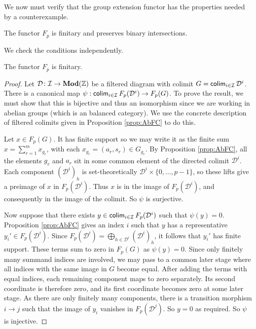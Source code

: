 \documentclass[runningheads]{llncs}
\begin{document}
We now must verify that the group extension functor has the properties needed by a counterexample.
\begin{propositionE}
The functor $F_p$ is finitary and preserves binary intersections.
\end{propositionE}
\begin{proofE}
We check the conditions independently.
\begin{lemma}
The functor $F_p$ is finitary.
\end{lemma}
\begin{proof}
Let $\mathcal D \colon \mathcal{I} \to \operatorname{\mathbf{Mod}}(\mathbb{Z})$ be a filtered diagram with colimit $G = \operatorname{\mathsf{colim}}_{i \in \mathcal{I}} \mathcal D^i$.
There is a canonical map $\psi:\operatorname{\mathsf{colim}}_{i\in\mathcal I} F_p(\mathcal D^i)\to F_p(G)$.
To prove the result, we must show that this is bijective and thus an isomorphism since we are working in abelian groups (which is an balanced category). 
We use the concrete description of filtered colimits given in Proposition \ref{prop:AbFC} to do this.

Let $x \in F_p(G)$. It has finite support so we may write it as the finite sum $x =\sum_{r=1}^m x_{g_r}$, with  each $x_{g_r}=(a_r,s_r) \in G_{g_r}$.
By Proposition \ref{prop:AbFC}, all the elements $g_r$ and $a_r$ sit in some common element of the directed colimit $\mathcal D^i$.
Each component $(\mathcal D^i)_h$ is set-theoretically $\mathcal D^i \times \{0, \dots, p-1\}$, so these lifts give a preimage of $x$ in $F_p(\mathcal D^i)$.
Thus $x$ is in the image of $F_p(\mathcal D^i)$, and consequently in the image of the colimit.
So $\psi$ is surjective.

Now suppose that there exists $y \in \operatorname{\mathsf{colim}}_{i \in \mathcal I} F_p(\mathcal D^i)$ such that $\psi(y) = 0$.
Proposition \ref{prop:AbFC} gives an index $i$ such that $y$ has a representative $y_i' \in F_p(\mathcal D^i)$.
Since $F_p(\mathcal D^i) = \bigoplus_{h\in\mathcal D^i}(\mathcal D^i)_h$, it follows that $y_i'$ has finite support.
These terms sum to zero in $F_p(G)$ as $\psi(y)=0$.
Since only finitely many summand indices are involved, we may pass to a common later stage where all indices with the same image in $G$ become equal.
After adding the terms with equal indices, each remaining component maps to zero separately.
Its second coordinate is therefore zero, and its first coordinate becomes zero at some later stage.
As there are only finitely many components, there is a transition morphism $i\to j$ such that the image of $y_i$ vanishes in $F_p(\mathcal D^j)$.
So $y=0$ as required. So $\psi$ is injective.


\end{proof}
\end{proofE}
\end{document}
